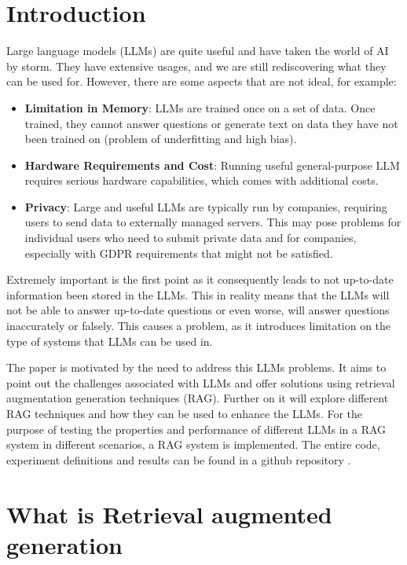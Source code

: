 \documentclass{wseas}
\begin{document}
\section{Introduction}

Large language models (LLMs) are quite useful and have taken the world of AI by storm. They have
extensive usages, and we are still rediscovering what they can be used
for. However, there are some aspects that are not ideal, for example:

\begin{itemize}

\item
  \textbf{Limitation in Memory}: LLMs are trained once on a set of data.
  Once trained, they cannot answer questions or generate text on data
  they have not been trained on (problem of underfitting and high
  bias).
\item
  \textbf{Hardware Requirements and Cost}: Running useful
  general-purpose LLM requires serious hardware capabilities, which
  comes with additional costs.
\item
  \textbf{Privacy}: Large and useful LLMs are typically run by
  companies, requiring users to send data to externally managed servers.
  This may pose problems for individual users who need to submit private
  data and for companies, especially with GDPR requirements that might
  not be satisfied.
\end{itemize}

Extremely important is the first point as it consequently leads to
not up-to-date information been stored in the LLMs. This in reality means that
the LLMs will not be able to answer up-to-date questions or even worse, will
answer questions inaccurately or falsely. This causes a problem, as it 
introduces limitation on the type of systems that LLMs can be used in.

The paper is motivated by the need to address this LLMs problems.
It aims to point out the challenges associated with LLMs and offer solutions
using retrieval augmentation generation techniques (RAG). 
Further on it will explore different RAG techniques and how they can be used  
to enhance the LLMs. For the purpose of testing the properties and performance 
of different LLMs in a RAG system in different scenarios, a RAG system is implemented. 
The entire code, experiment definitions and results can be found in a github repository
\cite{cite_github_solution}.

\section{What is Retrieval augmented generation}
\end{document}
